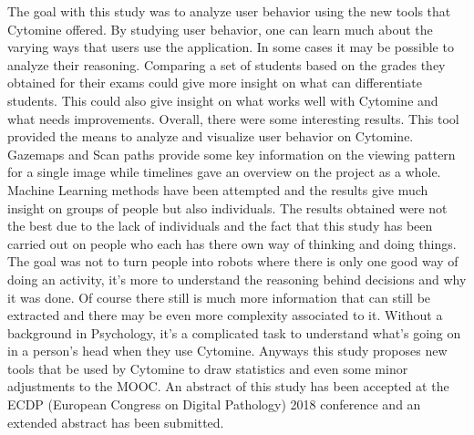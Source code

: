\documentclass[a4paper,11pt]{report}
\numberwithin{figure}{section} %
\begin{document}
    The goal with this study was to analyze user behavior using the new tools that Cytomine offered.
    By studying user behavior, one can learn much about the varying ways that users use the application.
    In some cases it may be possible to analyze their reasoning.
    Comparing a set of students based on the grades they obtained for their exams could give more insight on what can differentiate students.
    This could also give insight on what works well with Cytomine and what needs improvements.
    Overall, there were some interesting results.
    This tool provided the means to analyze and visualize user behavior on Cytomine.
    Gazemaps and Scan paths provide some key information on the viewing pattern for a single image while timelines gave an overview on the project as a whole.
    Machine Learning methods have been attempted and the results give much insight on groups of people but also individuals.
    The results obtained were not the best due to the lack of individuals and the fact that this study has been carried out on people who each has there own way of thinking and doing things.
    The goal was not to turn people into robots where there is only one good way of doing an activity, it's more to understand the reasoning behind decisions and why it was done.
    Of course there still is much more information that can still be extracted and there may be even more complexity associated to it.
    Without a background in Psychology, it's a complicated task to understand what's going on in a person's head when they use Cytomine.
    Anyways this study proposes new tools that be used by Cytomine to draw statistics and even some minor adjustments to the MOOC.
    An abstract of this study has been accepted at the  ECDP (European Congress on Digital Pathology) 2018 conference and an extended abstract has been submitted.


{}

\end{document}
